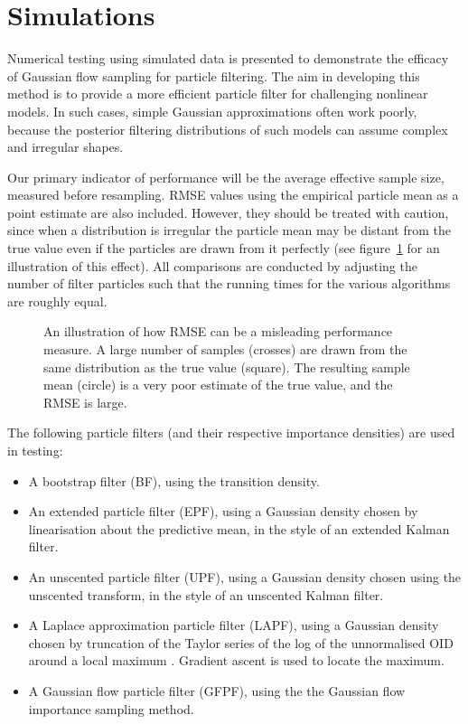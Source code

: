 \documentclass[12pt]{article}
\begin{document}
\section{Simulations}

Numerical testing using simulated data is presented to demonstrate the efficacy of Gaussian flow sampling for particle filtering. The aim in developing this method is to provide a more efficient particle filter for challenging nonlinear models. In such cases, simple Gaussian approximations often work poorly, because the posterior filtering distributions of such models can assume complex and irregular shapes.

Our primary indicator of performance will be the average effective sample size, measured before resampling. RMSE values using the empirical particle mean as a point estimate are also included. However, they should be treated with caution, since when a distribution is irregular the particle mean may be distant from the true value even if the particles are drawn from it perfectly (see figure~\ref{fig:rmse_fail} for an illustration of this effect). All comparisons are conducted by adjusting the number of filter particles such that the running times for the various algorithms are roughly equal.
%
\begin{figure}
\centering

\caption{An illustration of how RMSE can be a misleading performance measure. A large number of samples (crosses) are drawn from the same distribution as the true value (square). The resulting sample mean (circle) is a very poor estimate of the true value, and the RMSE is large.}
\label{fig:rmse_fail}
\end{figure}

The following particle filters (and their respective importance densities) are used in testing:
\begin{itemize}
        \item A bootstrap filter (BF), using the transition density.
        \item An extended particle filter (EPF), using a Gaussian density chosen by linearisation about the predictive mean, in the style of an extended Kalman filter.
        \item An unscented particle filter (UPF), using a Gaussian density chosen using the unscented transform, in the style of an unscented Kalman filter.
        \item A Laplace approximation particle filter (LAPF), using a Gaussian density chosen by truncation of the Taylor series of the log of the unnormalised OID around a local maximum \citep{Doucet2000a}. Gradient ascent is used to locate the maximum.
        \item A Gaussian flow particle filter (GFPF), using the the Gaussian flow importance sampling method.
\end{itemize}
\end{document}

